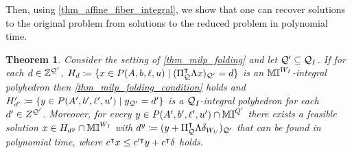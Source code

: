 \documentclass[pdflatex,sn-mathphys-num]{sn-jnl}%
\theoremstyle{thmstyleone}%
\newtheorem{theorem}[theorem]{Theorem}
\theoremstyle{thmstylethree}%
\theoremstyle{thmstyletwo}%
\begin{document}
Then, using \cref{thm_affine_fiber_integral}, we show that one can recover solutions to the original problem from solutions to the reduced problem in polynomial time.
\begin{theorem} \label{thm_fibers_symmetry_integral} Consider the setting of \cref{thm_milp_folding} and let $\mathcal{Q}'\subseteq \mathcal{Q}_I$.
    If for each $d \in \mathbb{Z}^{\mathcal{Q}'}$,  $H_d \coloneqq \{x\in P(A,b,\ell,u) \mid 
    (\transpose{\Pi_\MQ} \Lambda x)_{\MQ'} = d\}$ is an $\mathbb{MI}^{W_I}$-integral polyhedron then \eqref{thm_milp_folding_condition} holds and $H'_{d'} \coloneqq \{y\in P(A',b',\ell',u') \mid y_{\MQ'} = d'\}$ is a $\mathcal{Q}_I$-integral polyhedron for each $d'\in Z^{\mathcal{Q}'}$. Moreover, for every $y\in P(A',b',\ell',u')\cap \mathbb{MI}^{Q'}$ there exists a feasible solution $x \in H_{d^y}\cap \mathbb{MI}^{W_I}$ with $d^y \coloneqq (y + \transpose{\Pi_\MQ} \Lambda \delta_{W_U})_{\MQ'}$
    that can be found in polynomial time, where $c^{\intercal} x \leq c'^{\intercal} y + c^{\intercal} \delta$ holds.
\end{theorem}
\end{document}
